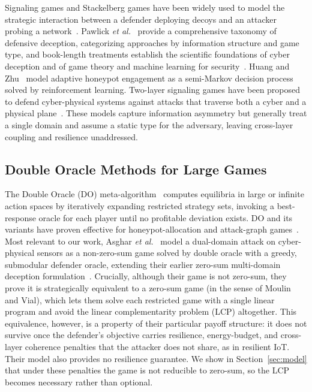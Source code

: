 \documentclass[conference]{IEEEtran}
\begin{document}
Signaling games and Stackelberg games have been widely used to model the
strategic interaction between a defender deploying decoys and an attacker
probing a network~\cite{tambe2011}. Pawlick \textit{et al.}~\cite{pawlick2019}
provide a comprehensive taxonomy of defensive deception, categorizing
approaches by information structure and game type, and book-length treatments
establish the scientific foundations of cyber deception and of game theory and
machine learning for security~\cite{jajodia2016,kamhoua2021}. Huang and
Zhu~\cite{huang2019} model adaptive honeypot engagement as a semi-Markov
decision process solved by reinforcement learning. Two-layer signaling games
have been proposed to defend cyber-physical systems against attacks that
traverse both a cyber and a physical plane~\cite{kamdem2024}. These models
capture information asymmetry but generally treat a single domain and assume a
static type for the adversary, leaving cross-layer coupling and resilience
unaddressed.

\subsection{Double Oracle Methods for Large Games}

The Double Oracle (DO) meta-algorithm~\cite{mcmahan2003} computes equilibria in
large or infinite action spaces by iteratively expanding restricted strategy
sets, invoking a best-response oracle for each player until no profitable
deviation exists. DO and its variants have proven effective for
honeypot-allocation and attack-graph
games~\cite{nguemkam2024,ngo2021,durkota2015}. Most relevant to our work, Asghar
\textit{et al.}~\cite{asghar2025} model a dual-domain attack on cyber-physical
sensors as a non-zero-sum game solved by double oracle with a greedy,
submodular defender oracle, extending their earlier zero-sum multi-domain
deception formulation~\cite{asghar2024cns}. Crucially, although their game is
not zero-sum, they prove it is strategically equivalent to a zero-sum
game (in the sense of Moulin and Vial), which lets them solve each restricted
game with a single linear program and avoid the linear complementarity problem
(LCP) altogether. This equivalence, however, is a property of their particular
payoff structure: it does not survive once the defender's objective carries
resilience, energy-budget, and cross-layer coherence penalties that the attacker
does not share, as in resilient IoT. Their model also provides no resilience
guarantee. We show in Section~\ref{sec:model} that under these penalties the
game is not reducible to zero-sum, so the LCP becomes necessary rather
than optional.
\end{document}

